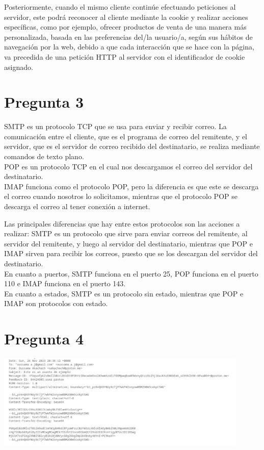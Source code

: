 \documentclass[spanish]{article}
\begin{document}
Posteriormente, cuando el mismo cliente continúe efectuando
peticiones al servidor, este podrá reconocer al cliente
mediante la cookie y realizar acciones específicas, como por
ejemplo, ofrecer productos de venta de una manera más
personalizada, basada en las preferencias del/la usuario/a,
según sus hábitos de navegación por la web, debido a que
cada interacción que se hace con la página, va precedida de
una petición HTTP al servidor con el identificador de cookie
asignado.

\section{Pregunta 3}

SMTP es un protocolo TCP que se usa para enviar y recibir
correo. La comunicación entre el cliente, que es el programa
de correo del remitente, y el servidor, que es el servidor
de correo recibido del destinatario, se realiza mediante
comandos de texto plano.\\

POP es un protocolo TCP en el cual nos descargamos el correo
del servidor del destinatario.\\

IMAP funciona como el protocolo POP, pero la diferencia es
que este se descarga el correo cuando nosotros lo
solicitamos, mientras que el protocolo POP se descarga el
correo al tener conexión a internet.\\

\newpage

Las principales diferencias que hay entre estos protocolos
son las acciones a realizar: SMTP es un protocolo que sirve
para enviar correos del remitente, al servidor del
remitente, y luego al servidor del destinatario, mientras
que POP e IMAP sirven para recibir los correos, puesto que
se los descargan del servidor del destinatario.\\

En cuanto a puertos, SMTP funciona en el puerto 25, POP
funciona en el puerto 110 e IMAP funciona en el puerto
143.\\

En cuanto a estados, SMTP es un protocolo sin estado,
mientras que POP e IMAP son protocolos con estado.

\section{Pregunta 4}

\begin{center}
\includegraphics[width=12cm]{../img/2.png}
\end{center}
\end{document}
